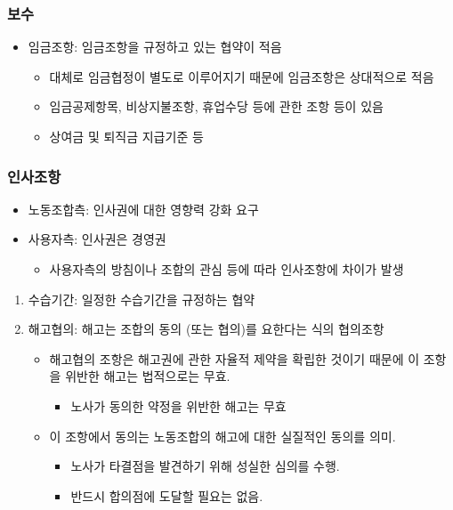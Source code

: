 \documentclass[aspectratio=169,xcolor=dvipsnames,handout]{beamer}
\begin{document}
\begin{frame}
    \frametitle{보수}
    \begin{itemize}[<+->]
        \item 임금조항: 임금조항을 규정하고 있는 협약이 적음
        \begin{itemize}[<+->]
            \item 대체로 임금협정이 별도로 이루어지기 때문에 임금조항은 상대적으로 적음 
            \item 임금공제항목, 비상지불조항, 휴업수당 등에 관한 조항 등이 있음
            \item 상여금 및 퇴직금 지급기준 등
        \end{itemize}
    \end{itemize}
\end{frame}

\begin{frame}
    \frametitle{인사조항}
    \begin{itemize}[<+->]
        \item 노동조합측: 인사권에 대한 영향력 강화 요구
        \item 사용자측: 인사권은 경영권
        \begin{itemize}[<+->]
            \item 사용자측의 방침이나 조합의 관심 등에 따라 인사조항에 차이가 발생
        \end{itemize}
    \end{itemize}
    \begin{enumerate}[<+->]
        \item 수습기간: 일정한 수습기간을 규정하는 협약
        \item 해고협의: 해고는 조합의 동의 (또는 협의)를 요한다는 식의 협의조항
        \begin{itemize}[<+->]
            \item 해고협의 조항은 해고권에 관한 자율적 제약을 확립한 것이기 때문에 이 조항을 위반한 해고는 법적으로는 무효.
            \begin{itemize}[<+->]
                \item 노사가 동의한 약정을 위반한 해고는 무효
            \end{itemize}
            \item 이 조항에서 동의는 노동조합의 해고에 대한 실질적인 동의를 의미.
            \begin{itemize}[<+->]
                \item 노사가 타결점을 발견하기 위해 성실한 심의를 수행. 
                \item 반드시 합의점에 도달할 필요는 없음.
            \end{itemize}
        \end{itemize}
    \end{enumerate}
\end{frame}
\end{document}
